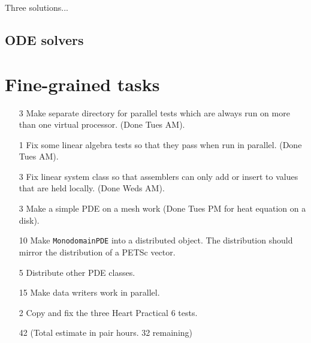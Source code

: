 \documentclass{article}
\begin{document}
Three solutions...

\subsection{ODE solvers}

\section{Fine-grained tasks}

\begin{itemize}
\item[3]
Make separate directory for parallel tests which are always run on
more than one virtual processor.  (Done Tues AM).
\item[1]
Fix some linear algebra tests so that they pass when run in
parallel. (Done Tues AM). 
\item[3] 
Fix linear system class so that assemblers can only add or insert to
values that are held locally. (Done Weds AM).
\item[3]
Make a simple PDE on a mesh work (Done Tues PM for heat equation on a disk).
\item[10]
Make {\tt MonodomainPDE} into a distributed object. The distribution
should mirror the distribution of a PETSc vector.
\item[5]
Distribute other PDE classes.
\item[15]
Make data writers work in parallel.
\item[2] 
Copy and fix the three Heart Practical 6 tests.
\item[42] (Total estimate in pair hours.  32 remaining)
\end{itemize}
\end{document}
